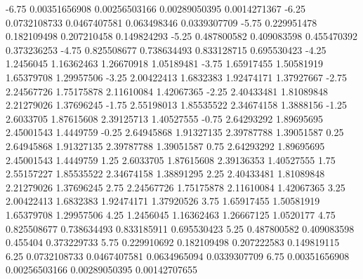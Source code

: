 -6.75  0.00351656908  0.00256503166  0.00289050395  0.0014271367
-6.25  0.0732108733  0.0467407581  0.063498346  0.0339307709
-5.75  0.229951478  0.182109498  0.207210458  0.149824293
-5.25  0.487800582  0.409083598  0.455470392  0.373236253
-4.75  0.825508677  0.738634493  0.833128715  0.695530423
-4.25  1.2456045  1.16362463  1.26670918  1.05189481
-3.75  1.65917455  1.50581919  1.65379708  1.29957506
-3.25  2.00422413  1.6832383  1.92474171  1.37927667
-2.75  2.24567726  1.75175878  2.11610084  1.42067365
-2.25  2.40433481  1.81089848  2.21279026  1.37696245
-1.75  2.55198013  1.85535522  2.34674158  1.3888156
-1.25  2.6033705  1.87615608  2.39125713  1.40527555
-0.75  2.64293292  1.89695695  2.45001543  1.4449759
-0.25  2.64945868  1.91327135  2.39787788  1.39051587
0.25  2.64945868  1.91327135  2.39787788  1.39051587
0.75  2.64293292  1.89695695  2.45001543  1.4449759
1.25  2.6033705  1.87615608  2.39136353  1.40527555
1.75  2.55157227  1.85535522  2.34674158  1.38891295
2.25  2.40433481  1.81089848  2.21279026  1.37696245
2.75  2.24567726  1.75175878  2.11610084  1.42067365
3.25  2.00422413  1.6832383  1.92474171  1.37920526
3.75  1.65917455  1.50581919  1.65379708  1.29957506
4.25  1.2456045  1.16362463  1.26667125  1.0520177
4.75  0.825508677  0.738634493  0.833185911  0.695530423
5.25  0.487800582  0.409083598  0.455404  0.373229733
5.75  0.229910692  0.182109498  0.207222583  0.149819115
6.25  0.0732108733  0.0467407581  0.0634965094  0.0339307709
6.75  0.00351656908  0.00256503166  0.00289050395  0.00142707655
